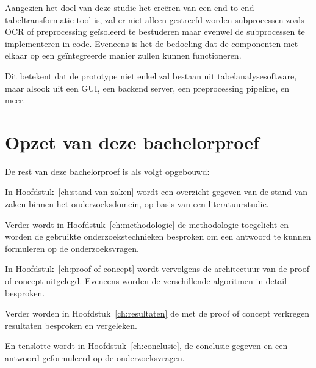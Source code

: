 Aangezien het doel van deze studie het creëren van een end-to-end tabeltransformatie-tool is, zal er niet alleen gestreefd worden subprocessen zoals \Gls{OCR} of preprocessing geïsoleerd te bestuderen maar evenwel de subprocessen te implementeren in code. Eveneens is het de bedoeling dat de componenten met elkaar op een geïntegreerde manier zullen kunnen functioneren.

Dit betekent dat de prototype niet enkel zal bestaan uit tabelanalysesoftware, maar alsook uit een GUI, een backend server, een preprocessing pipeline, en meer. 

\section{Opzet van deze bachelorproef}
\label{sec:opzet-bachelorproef}


De rest van deze bachelorproef is als volgt opgebouwd:

In Hoofdstuk~\ref{ch:stand-van-zaken} wordt een overzicht gegeven van de stand van zaken binnen het onderzoeksdomein, op basis van een literatuurstudie.

Verder wordt in Hoofdstuk~\ref{ch:methodologie} de methodologie toegelicht en worden de gebruikte onderzoekstechnieken besproken om een antwoord te kunnen formuleren op de onderzoeksvragen.

In Hoofdstuk~\ref{ch:proof-of-concept} wordt vervolgens de architectuur van de proof of concept uitgelegd. Eveneens worden de verschillende algoritmen in detail besproken.

Verder worden in Hoofdstuk~\ref{ch:resultaten} de met de proof of concept verkregen resultaten besproken en vergeleken.

En tenslotte wordt in Hoofdstuk~\ref{ch:conclusie}, de conclusie gegeven en een antwoord geformuleerd op de onderzoeksvragen.
